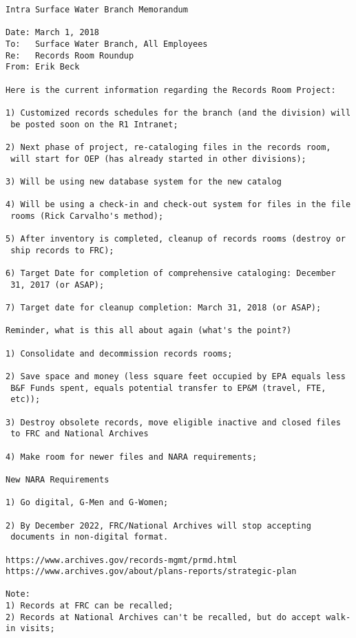 \documentclass{article}
\begin{document}
\begin{verbatim}
Intra Surface Water Branch Memorandum

Date: March 1, 2018
To:   Surface Water Branch, All Employees
Re:   Records Room Roundup
From: Erik Beck

Here is the current information regarding the Records Room Project:

1) Customized records schedules for the branch (and the division) will
 be posted soon on the R1 Intranet;

2) Next phase of project, re-cataloging files in the records room,
 will start for OEP (has already started in other divisions);

3) Will be using new database system for the new catalog

4) Will be using a check-in and check-out system for files in the file
 rooms (Rick Carvalho's method);

5) After inventory is completed, cleanup of records rooms (destroy or
 ship records to FRC);

6) Target Date for completion of comprehensive cataloging: December
 31, 2017 (or ASAP);

7) Target date for cleanup completion: March 31, 2018 (or ASAP);

Reminder, what is this all about again (what's the point?)

1) Consolidate and decommission records rooms;

2) Save space and money (less square feet occupied by EPA equals less
 B&F Funds spent, equals potential transfer to EP&M (travel, FTE,
 etc));

3) Destroy obsolete records, move eligible inactive and closed files
 to FRC and National Archives

4) Make room for newer files and NARA requirements;

New NARA Requirements

1) Go digital, G-Men and G-Women;

2) By December 2022, FRC/National Archives will stop accepting
 documents in non-digital format.

https://www.archives.gov/records-mgmt/prmd.html
https://www.archives.gov/about/plans-reports/strategic-plan

Note:
1) Records at FRC can be recalled;
2) Records at National Archives can't be recalled, but do accept walk-in visits;

\end{verbatim}
\end{document}
